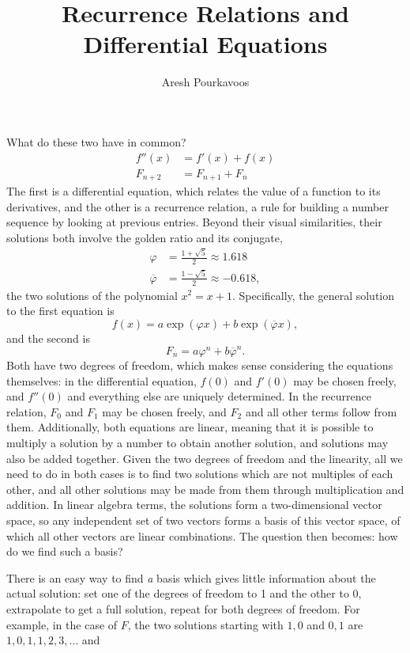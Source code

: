 \documentclass{article}
\begin{document}
\title{Recurrence Relations and Differential Equations}
\author{Aresh Pourkavoos}
\maketitle

What do these two have in common?
\begin{align*}
  f''(x) &= f'(x)+f(x) \\
  F_{n+2} &= F_{n+1}+F_n
\end{align*}
The first is a differential equation,
which relates the value of a function to its derivatives,
and the other is a recurrence relation,
a rule for building a number sequence by looking at previous entries.
Beyond their visual similarities,
their solutions both involve the golden ratio and its conjugate,
\begin{align*}
  \varphi &= \frac{1+\sqrt{5}}{2} \approx 1.618 \\
  \overline{\varphi} &= \frac{1-\sqrt{5}}{2} \approx -0.618,
\end{align*}
the two solutions of the polynomial
$x^2=x+1$.
Specifically, the general solution to the first equation is
\[f(x) = a\exp(\varphi x)+b\exp(\overline{\varphi}x),\]
and the second is
\[F_n = a\varphi^n+b\overline{\varphi}^n.\]
Both have two degrees of freedom,
which makes sense considering the equations themselves:
in the differential equation,
$f(0)$ and $f'(0)$ may be chosen freely,
and $f''(0)$ and everything else are uniquely determined.
In the recurrence relation,
$F_0$ and $F_1$ may be chosen freely,
and $F_2$ and all other terms follow from them.
Additionally, both equations are linear,
meaning that it is possible to multiply a solution by a number
to obtain another solution,
and solutions may also be added together.
Given the two degrees of freedom
and the linearity,
all we need to do in both cases
is to find two solutions
which are not multiples of each other,
and all other solutions may be made from them
through multiplication and addition.
In linear algebra terms,
the solutions form a two-dimensional vector space,
so any independent set of two vectors
forms a basis of this vector space,
of which all other vectors are linear combinations.
The question then becomes: how do we find such a basis?

There is an easy way to find \textit{a} basis
which gives little information about the actual solution:
set one of the degrees of freedom to 1 and the other to 0,
extrapolate to get a full solution,
repeat for both degrees of freedom.
For example, in the case of $F$,
the two solutions starting with $1, 0$ and $0, 1$
are $1, 0, 1, 1, 2, 3, \ldots$ and 



\end{document}
